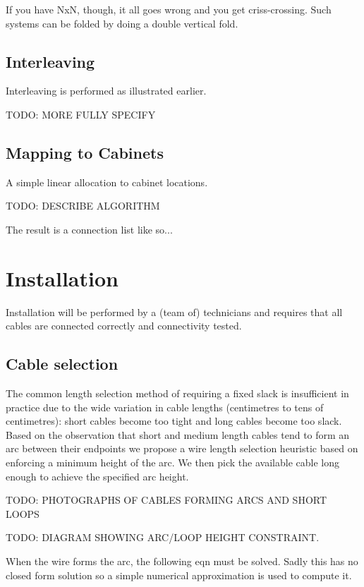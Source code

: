 			If you have NxN, though, it all goes wrong and you get criss-crossing.
			Such systems can be folded by doing a double vertical fold.
		
		\subsection{Interleaving}
			
			Interleaving is performed as illustrated earlier.
			
			TODO: MORE FULLY SPECIFY
		
		\subsection{Mapping to Cabinets}
			
			A simple linear allocation to cabinet locations.
			
			TODO: DESCRIBE ALGORITHM
			
			The result is a connection list like so...
		
	\section{Installation}
		
		Installation will be performed by a (team of) technicians and requires that
		all cables are connected correctly and connectivity tested.
		
		\subsection{Cable selection}
			
			The common length selection method of requiring a fixed slack is
			insufficient in practice due to the wide variation in cable lengths
			(centimetres to tens of centimetres): short cables become too tight and
			long cables become too slack. Based on the observation that short and
			medium length cables tend to form an arc between their endpoints we
			propose a wire length selection heuristic based on enforcing a minimum
			height of the arc. We then pick the available cable long enough to
			achieve the specified arc height.
			
			TODO: PHOTOGRAPHS OF CABLES FORMING ARCS AND SHORT LOOPS
			
			TODO: DIAGRAM SHOWING ARC/LOOP HEIGHT CONSTRAINT.
			
			When the wire forms the arc, the following eqn must be solved. Sadly this
			has no closed form solution so a simple numerical approximation is used
			to compute it.
			
